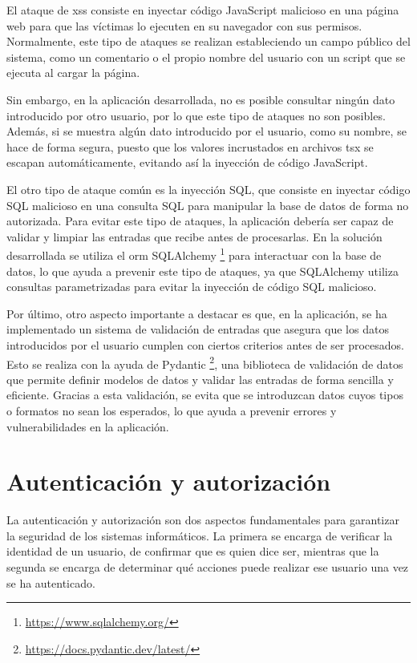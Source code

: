 El ataque de \gls{xss} consiste en inyectar código JavaScript malicioso en una página web para que
las víctimas lo ejecuten en su navegador con sus permisos. Normalmente, este tipo de ataques se realizan
estableciendo un campo público del sistema, como un comentario o el propio nombre del usuario con un
script que se ejecuta al cargar la página.

Sin embargo, en la aplicación desarrollada, no es posible consultar ningún dato introducido por otro usuario,
por lo que este tipo de ataques no son posibles. Además, si se muestra algún dato introducido por el usuario,
como su nombre, se hace de forma segura, puesto que los valores incrustados en archivos \gls{tsx} se escapan
automáticamente, evitando así la inyección de código JavaScript.

El otro tipo de ataque común es la inyección SQL, que consiste en inyectar código SQL malicioso en
una consulta SQL para manipular la base de datos de forma no autorizada. Para evitar este tipo de
ataques, la aplicación debería ser capaz de validar y limpiar las entradas que recibe antes de
procesarlas. En la solución desarrollada se utiliza el \gls{orm} SQLAlchemy
\footnote{\url{https://www.sqlalchemy.org/}} para interactuar con la base de datos, lo que ayuda a
prevenir este tipo de ataques, ya que SQLAlchemy utiliza consultas parametrizadas para
evitar la inyección de código SQL malicioso.

Por último, otro aspecto importante a destacar es que, en la aplicación, se ha implementado
un sistema de validación de entradas que asegura que los datos introducidos por el usuario cumplen
con ciertos criterios antes de ser procesados. Esto se realiza con la ayuda de Pydantic%
\footnote{\url{https://docs.pydantic.dev/latest/}}, una biblioteca de validación de datos que
permite definir modelos de datos y validar las entradas de forma sencilla y eficiente. Gracias a
esta validación, se evita que se introduzcan datos cuyos tipos o formatos no sean los esperados,
lo que ayuda a prevenir errores y vulnerabilidades en la aplicación.

\section{Autenticación y autorización}
\label{anexo4:sec:autenticacion}
La autenticación y autorización son dos aspectos fundamentales para garantizar la seguridad de los
sistemas informáticos. La primera se encarga de verificar la identidad de un usuario, de confirmar
que es quien dice ser, mientras que la segunda se encarga de determinar qué acciones puede realizar
ese usuario una vez se ha autenticado.

